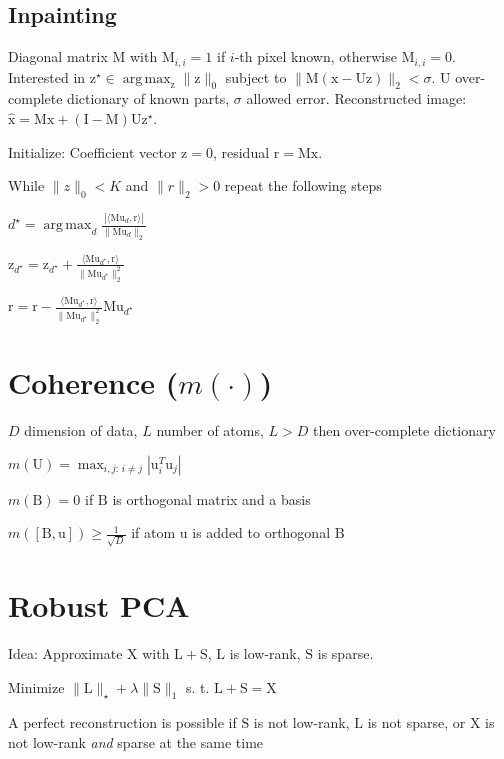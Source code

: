 \documentclass[a4paper, 11pt, landscape]{article}
\newcommand{\matr}[1]{\boldsymbol{\mathrm{#1}}}
\DeclareMathOperator*{\argmax}{arg\,max}
\begin{document}
\begin{multicols*}{3}
\subsection{Inpainting}
Diagonal matrix $\matr{M}$ with $\matr{M}_{i, i} = 1$ if $i$-th pixel known, otherwise $\matr{M}_{i,i} = 0$. Interested in $\matr{z}^\star \in \argmax_{\matr{z}} \|\matr{z}\|_0$ subject to $\|\matr{M}(\matr{x} - \matr{Uz})\|_2 < \sigma$. $\matr{U}$ over-complete dictionary of known parts, $\sigma$ allowed error. Reconstructed image: $\hat{\matr{x}} = \matr{Mx} + (\matr{I} - \matr{M})\matr{U} \matr{z}^\star$.
\begin{compactenum}
	\item Initialize: Coefficient vector $\matr{z} = \matr{0}$, residual $\matr{r} = \matr{M}\matr{x}$.
	\item While $\|z\|_0 < K$ and $\|r\|_2 > 0$ repeat the following steps
	\begin{listcols}[2][5pt]
		\item $d^\star = \argmax_d \frac{|\langle \matr{M}\matr{u}_d, \matr{r}\rangle|}{\|\matr{M}\matr{u}_d\|_2}$
		\item $\matr{z}_{d^\star} = \matr{z}_{d^\star} + \frac{\langle \matr{M}\matr{u}_{d^\star}, \matr{r} \rangle}{\|\matr{M}\matr{u}_{d^\star}\|_2^2}$
		\item $\matr{r} = \matr{r} - \frac{\langle \matr{M}\matr{u}_{d^\star}, \matr{r} \rangle}{\|\matr{M}\matr{u}_{d^\star}\|_2^2} \matr{M}\matr{u}_{d^\star}$
	\end{listcols}
\end{compactenum}


\section{Coherence ($m(\cdot)$)}
\begin{compactitem}
	\item $D$ dimension of data, $L$ number of atoms, $L > D$ then over-complete dictionary
	\item $m(\matr{U}) = \max_{i,j:\, i \neq j} | \matr{u}_i^T \matr{u}_j |$
	\item $m(\matr{B}) = 0$ if $\matr{B}$ is orthogonal matrix and a basis
	\item $m([\matr{B}, \matr{u}]) \geq \frac{1}{\sqrt{D}}$ if atom $\matr{u}$ is added to orthogonal $\matr{B}$
\end{compactitem}

\section{Robust PCA}
\begin{compactitem}
	\item Idea: Approximate $\matr{X}$ with $\matr{L} + \matr{S}$, $\matr{L}$ is low-rank, $\matr{S}$ is sparse.
	\item Minimize $\|\matr{L}\|_\star + \lambda \|\matr{S}\|_1$ s. t. $\matr{L} + \matr{S} = \matr{X}$
	\item A perfect reconstruction is possible if $\matr{S}$ is not low-rank, $\matr{L}$ is not sparse, or $\matr{X}$ is not low-rank \textit{and} sparse at the same time
\end{compactitem}


\end{multicols*}
\end{document}
